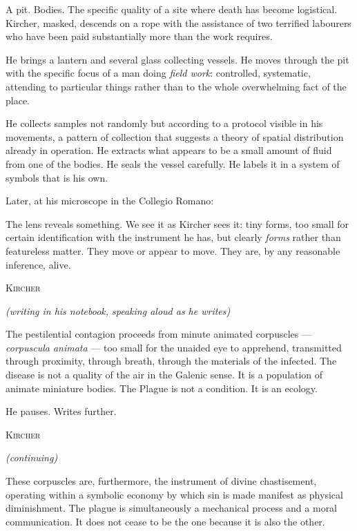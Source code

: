 \documentclass[12pt, a4paper, twoside]{memoir}
\theoremstyle{definition}
\theoremstyle{remark}
\newenvironment{action}{%
  \vspace{4pt}%
  \noindent\begin{minipage}{\linewidth}%
  \setlength{\parindent}{0pt}%
  \itshape\color{kircherink}%
}{%
  \end{minipage}\vspace{6pt}%
}
\newenvironment{dialogue}[1]{%
  \vspace{6pt}%
  \noindent\hspace{24mm}%
  \begin{minipage}{0.6\linewidth}%
  \begin{center}%
  {\small\textsc{#1}}%
  \end{center}%
  \vspace{2pt}%
}{%
  \end{minipage}\vspace{6pt}%
}
\newcommand{\paren}[1]{%
  \begin{center}%
  \small\itshape\color{plaguegrey}(#1)%
  \end{center}%
}
\begin{document}
\begin{action}
A pit. Bodies. The specific quality of a site where death has become logistical. Kircher, masked, descends on a rope with the assistance of two terrified labourers who have been paid substantially more than the work requires.

He brings a lantern and several glass collecting vessels. He moves through the pit with the specific focus of a man doing \textit{field work}: controlled, systematic, attending to particular things rather than to the whole overwhelming fact of the place.

He collects samples not randomly but according to a protocol visible in his movements, a pattern of collection that suggests a theory of spatial distribution already in operation. He extracts what appears to be a small amount of fluid from one of the bodies. He seals the vessel carefully. He labels it in a system of symbols that is his own.
\end{action}

\begin{action}
Later, at his microscope in the Collegio Romano:

The lens reveals something. We see it as Kircher sees it: tiny forms, too small for certain identification with the instrument he has, but clearly \textit{forms} rather than featureless matter. They move or appear to move. They are, by any reasonable inference, alive.
\end{action}

\begin{dialogue}{Kircher}
\paren{writing in his notebook, speaking aloud as he writes}
The pestilential contagion proceeds from minute animated corpuscles --- \textit{corpuscula animata} --- too small for the unaided eye to apprehend, transmitted through proximity, through breath, through the materials of the infected. The disease is not a quality of the air in the Galenic sense. It is a population of animate miniature bodies. The Plague is not a condition. It is an ecology.
\end{dialogue}

\begin{action}
He pauses. Writes further.
\end{action}

\begin{dialogue}{Kircher}
\paren{continuing}
These corpuscles are, furthermore, the instrument of divine chastisement, operating within a symbolic economy by which sin is made manifest as physical diminishment. The plague is simultaneously a mechanical process and a moral communication. It does not cease to be the one because it is also the other.
\end{dialogue}
\end{document}
